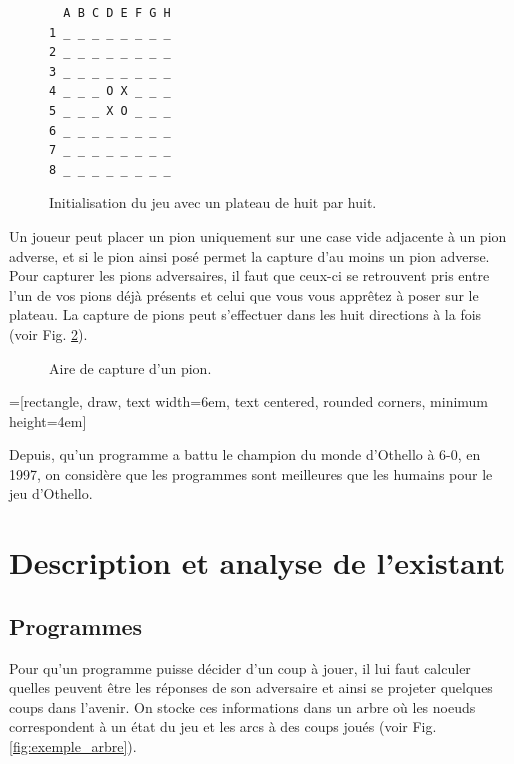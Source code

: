 \documentclass[10pt,a4paper]{article}
\begin{document}
\begin{figure}[H]    
\centering
\begin{BVerbatim}
  A B C D E F G H
1 _ _ _ _ _ _ _ _
2 _ _ _ _ _ _ _ _
3 _ _ _ _ _ _ _ _
4 _ _ _ O X _ _ _
5 _ _ _ X O _ _ _
6 _ _ _ _ _ _ _ _
7 _ _ _ _ _ _ _ _
8 _ _ _ _ _ _ _ _
\end{BVerbatim}
\caption {Initialisation du jeu avec un plateau de huit par huit. \label{fig:début_du_jeu}}
\end{figure}
\newpage
Un joueur peut placer un pion uniquement sur une case vide adjacente à un pion adverse, et si le pion ainsi posé permet la capture d'au moins un pion adverse. Pour capturer les pions adversaires, il faut que ceux-ci se retrouvent pris entre l'un de vos pions déjà présents et celui que vous vous apprêtez à poser sur le plateau. La capture de pions peut s'effectuer dans les huit directions à la fois (voir Fig. \ref{fig:aire_de_capture}).

\begin{figure}[H]    
\centering
{}
\caption {Aire de capture d'un pion.\label{fig:aire_de_capture}}
\end{figure}
=[rectangle, draw, text width=6em, text centered, rounded corners, minimum height=4em]

Depuis, qu'un programme a battu le champion du monde d'Othello à 6-0, en 1997\cite{CK06}, on considère que les programmes sont meilleures que les humains pour le jeu d'Othello.

\section{Description et analyse de l'existant}

\subsection{Programmes}
\label{sec:programmes}
Pour qu'un programme puisse décider d'un coup à jouer, il lui faut calculer quelles peuvent être les réponses de son adversaire et ainsi se projeter quelques coups dans l'avenir. On stocke ces informations dans un arbre où les noeuds correspondent à un état du jeu et les arcs à des coups joués (voir Fig. \ref{fig:exemple_arbre}).\\
\end{document}

